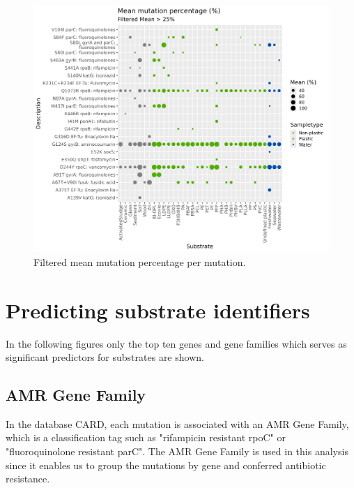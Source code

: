 \begin{figure}[!h]
    \centering
    \includegraphics[width = \textwidth]{figure/relative_mean_points_25.png}
    \caption{Filtered mean mutation percentage per mutation.}
    \label{pointplot_mutations}
\end{figure}


\section{Predicting substrate identifiers} 
%
In the following figures only the top ten genes and gene families which serves as significant predictors for substrates are shown.

\subsection{AMR Gene Family}
In the database CARD, each mutation is associated with an AMR Gene Family, which is a classification tag such as "rifampicin resistant rpoC" or "fluoroquinolone resistant parC". The AMR Gene Family is used in this analysis since it enables us to group the mutations by gene and conferred antibiotic resistance.

